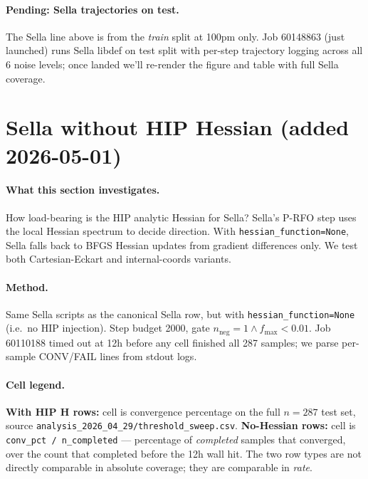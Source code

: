 \documentclass[11pt]{article}
\begin{document}
\paragraph{Pending: Sella trajectories on test.} The Sella line above
is from the \emph{train} split at 100pm only. Job 60148863 (just
launched) runs Sella libdef on test split with per-step trajectory
logging across all 6 noise levels; once landed we'll re-render the
figure and table with full Sella coverage.

\section{Sella without HIP Hessian (added 2026-05-01)}

\paragraph{What this section investigates.} How load-bearing is the
HIP analytic Hessian for Sella? Sella's P-RFO step uses the local Hessian
spectrum to decide direction. With \texttt{hessian\_function=None}, Sella
falls back to BFGS Hessian updates from gradient differences only. We
test both Cartesian-Eckart and internal-coords variants.

\paragraph{Method.} Same Sella scripts as the canonical Sella row, but
with \texttt{hessian\_function=None} (i.e.\ no HIP injection). Step
budget 2000, gate $n_{\text{neg}}{=}1 \wedge f_{\max}{<}0.01$.
Job 60110188 timed out at 12h before any cell finished
all 287 samples; we parse per-sample CONV/FAIL lines from stdout logs.

\paragraph{Cell legend.}
\textbf{With HIP H rows:} cell is convergence percentage on the full
$n=287$ test set, source \texttt{analysis\_2026\_04\_29/threshold\_sweep.csv}.
\textbf{No-Hessian rows:} cell is \texttt{conv\_pct / n\_completed} —
percentage of \emph{completed} samples that converged, over the count
that completed before the 12h wall hit. The two row types are not
directly comparable in absolute coverage; they are comparable in
\emph{rate}.
\end{document}
